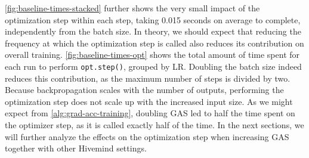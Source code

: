 \autoref{fig:baseline-times-stacked} further shows the very small impact of the optimization step within each step, taking 0.015 seconds on average to complete, independently from the batch size.
In theory, we should expect that reducing the frequency at which the optimization step is called also reduces its contribution on overall training.
\autoref{fig:baseline-times-opt} shows the total amount of time spent for each run to perform \texttt{opt.step()}, grouped by LR.
Doubling the batch size indeed reduces this contribution, as the maximum number of steps is divided by two.
Because backpropagation scales with the number of outputs, performing the optimization step does not scale up with the increased input size.
As we might expect from \autoref{alg:grad-acc-training}, doubling GAS led to half the time spent on the optimizer step, as it is called exactly half of the time.
In the next sections, we will further analyze the effects on the optimization step when increasing GAS together with other Hivemind settings.








